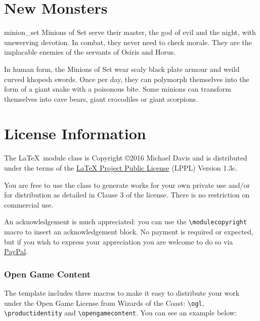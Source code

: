 \documentclass[letterpaper,serif]{module}
\begin{document}
\lipsum[10]

\clearpage

%
%

\part{New Monsters}


\begin{newmonster}{minion_set}\label{minion_set}%
Minions of Set serve their master, the god of evil and the night, with unswerving devotion. In combat, they
never need to check morale. They are the implacable enemies of the servants of Osiris and Horus.

In human form, the Minions of Set wear scaly black plate armour and weild curved khopesh swords. Once per
day, they can polymorph themselves into the form of a giant snake with a poisonous bite. Some minions can
transform themselves into cave bears, giant crocodiles or giant scorpions.
\end{newmonster}

\part{License Information}

The \LaTeX~module class is Copyright \copyright 2016 Michael Davis and is distributed under the terms of the
\href{http://www.latex-project.org/lppl.txt}{LaTeX Project Public License} (LPPL) Version 1.3c.

You are free to use the class to generate works for your own private use and/or for distribution as detailed in
Clause 3 of the license. There is no restriction on commercial use.

An acknowledgement is much appreciated: you can use the \verb|\modulecopyright| macro to insert an acknowledgement
block. No payment is required or expected, but if you wish to express your appreciation you are welcome to do so via
\href{https://paypal.me/slithy}{PayPal}.

%
%

\section{Open Game Content}
\label{ogl}

The template includes three macros to make it easy to distribute your work under the Open Game License
from Wizards of the Coast: \verb|\ogl|, \verb|\productidentity| and \verb|\opengamecontent|. You can see
an example below:
\end{document}
